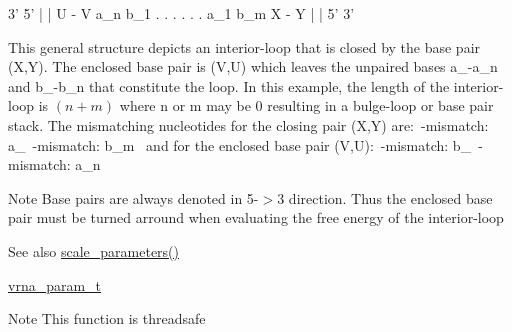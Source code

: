 \begin{DoxyPre}
      3'  5'
      |   |
      U - V
  a\_n       b\_1
   .        .
   .        .
   .        .
  a\_1       b\_m
      X - Y
      |   |
      5'  3'
\end{DoxyPre}
 This general structure depicts an interior-\/loop that is closed by the base pair (X,Y). The enclosed base pair is (V,U) which leaves the unpaired bases a\+\_-\/a\+\_\+n and b\+\_-\/b\+\_\+n that constitute the loop. In this example, the length of the interior-\/loop is $(n+m)$ where n or m may be 0 resulting in a bulge-\/loop or base pair stack. The mismatching nucleotides for the closing pair (X,Y) are\+:~\textquotesingle{}-\/mismatch\+: a\+\_~\textquotesingle{}-\/mismatch\+: b\+\_\+m~\newline
 and for the enclosed base pair (V,U)\+:~\textquotesingle{}-\/mismatch\+: b\+\_~\textquotesingle{}-\/mismatch\+: a\+\_\+n~\newline
 \begin{DoxyNote}{Note}
Base pairs are always denoted in 5\textquotesingle{}-\/$>$3\textquotesingle{} direction. Thus the enclosed base pair must be \textquotesingle{}turned arround\textquotesingle{} when evaluating the free energy of the interior-\/loop 
\end{DoxyNote}
\begin{DoxySeeAlso}{See also}
\hyperlink{group__energy__parameters_ga541f2cf7436e9bc939b0a49b24baf987}{scale\+\_\+parameters()} 

\hyperlink{group__energy__parameters_ga8a69ca7d787e4fd6079914f5343a1f35}{vrna\+\_\+param\+\_\+t} 
\end{DoxySeeAlso}
\begin{DoxyNote}{Note}
This function is threadsafe
\end{DoxyNote}

